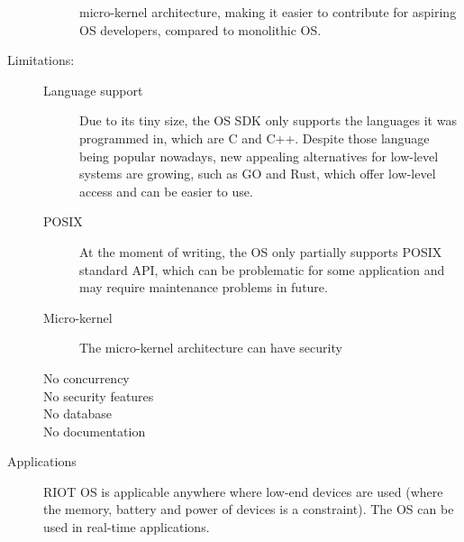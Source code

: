 \documentclass[a4paper, 12pt]{article}
\begin{document}
\begin{exercise}
\begin{description}
\begin{description}
				micro-kernel architecture, making it easier to contribute for
				aspiring OS developers, compared to monolithic OS.  
		\end{description}
	\item[Limitations:]
		\begin{description}
		    \item[Language support] Due to its tiny size, the OS SDK only
				supports the languages it was programmed in, which are C and
				C++. Despite those language being popular nowadays, new appealing
				alternatives for low-level systems are growing, 
				such as GO and Rust, which offer low-level access and can be easier
				to use.
			\item[POSIX] At the moment of writing, the OS only partially
				supports POSIX standard API, which can be problematic for some
				application and may require maintenance problems in future.
			\item[Micro-kernel] The micro-kernel architecture can have security  
			\item[No concurrency]
			\item[No security features]
			\item[No database]
			\item[No documentation]
		\end{description}
	\item[Applications] RIOT OS is applicable anywhere where low-end devices are
		used (where the memory, battery and power of devices is a constraint).
		The OS can be used in real-time applications.
\end{description}




\end{exercise}



\medskip

\printbibliography

\doclicenseThis
\end{document}
